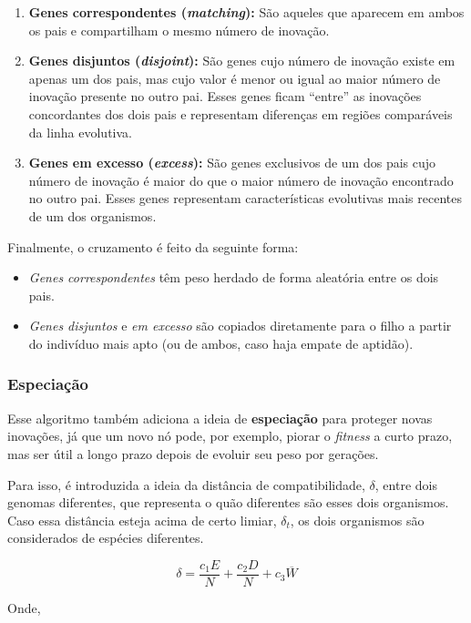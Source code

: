 \documentclass[12pt]{article}
\begin{document}
\begin{enumerate}
  \item \textbf{Genes correspondentes (\textit{matching}):}  
    São aqueles que aparecem em ambos os pais e compartilham o mesmo número de inovação.
  
  \item \textbf{Genes disjuntos (\textit{disjoint}):}  
    São genes cujo número de inovação existe em apenas um dos pais, mas cujo valor é menor ou igual ao maior número de inovação presente no outro pai. Esses genes ficam “entre” as inovações concordantes dos dois pais e representam diferenças em regiões comparáveis da linha evolutiva.
  
  \item \textbf{Genes em excesso (\textit{excess}):}  
    São genes exclusivos de um dos pais cujo número de inovação é maior do que o maior número de inovação encontrado no outro pai. Esses genes representam características evolutivas mais recentes de um dos organismos.
\end{enumerate}

Finalmente, o cruzamento é feito da seguinte forma:
\begin{itemize}
  \item \textit{Genes correspondentes} têm peso herdado de forma aleatória entre os dois pais.
  \item \textit{Genes disjuntos} e \textit{em excesso} são copiados diretamente para o filho a partir do indivíduo mais apto (ou de ambos, caso haja empate de aptidão).
\end{itemize}

\subsubsection{Especiação}
Esse algoritmo também adiciona a ideia de \textbf{especiação} para proteger novas inovações, já que um novo nó pode, por exemplo, piorar o \textit{fitness} a curto prazo, mas ser útil a longo prazo depois de evoluir seu peso por gerações. 

Para isso, é introduzida a ideia da distância de compatibilidade, $\delta$, entre dois genomas diferentes, que representa o quão diferentes são esses dois organismos. Caso essa distância esteja acima de certo limiar, $\delta_t$, os dois organismos são considerados de espécies diferentes.

\[
\delta = \frac{c_1E}{N} + \frac{c_2D}{N} + c_3\overline{W}
\]

Onde,
\end{document}
